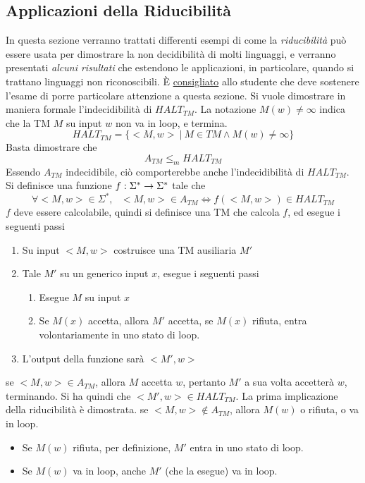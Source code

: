 \documentclass[10pt, letterpaper]{report}
\begin{document}
\subsection{Applicazioni della Riducibilità}
In questa sezione verranno trattati differenti esempi di come la \textit{riducibilità} può essere usata per dimostrare la non decidibilità di molti linguaggi, e verranno presentati \textit{alcuni risultati} che estendono le applicazioni, in particolare, quando si trattano linguaggi non riconoscibili. È \underline{consigliato} allo studente che deve sostenere l'esame di porre particolare attenzione a questa sezione.
Si vuole dimostrare in maniera formale l'indecidibilità di $HALT_{TM}$. La notazione $M(w)\ne\infty$ indica che la TM $M$ su input $w$ non va in loop, e termina. 
$$ HALT_{TM}=\{<M,w> \ | \ M\in TM\land M(w)\ne\infty \}$$
Basta dimostrare che $$ A_{TM}\le_m HALT_{TM}$$
Essendo $A_{TM}$ indecidibile, ciò comporterebbe anche l'indecidibilità di $HALT_{TM}$. Si definisce una funzione ${f:\Sigma^*\rightarrow \Sigma^*}$ tale che 
$$ \forall <M,w>\in\Sigma^*, \ \ \ <M,w>\in A_{TM}\iff f(<M,w>)\in HALT_{TM}$$
$f$ deve essere calcolabile, quindi si definisce una TM che calcola $f$, ed esegue i seguenti passi 
\begin{enumerate}
    \item Su input $<M,w>$ costruisce una TM ausiliaria $M'$
    \item Tale $M'$ su un generico input $x$, esegue i seguenti passi\begin{enumerate}
        \item Esegue $M$ su input $x$
        \item Se $M(x)$ accetta, allora $M'$ accetta, se $M(x)$ rifiuta, entra volontariamente in uno stato di loop.
    \end{enumerate}
    \item L'output della funzione sarà $<M',w>$
\end{enumerate}
\boxedMath{$\implies$} se $<M,w>\in A_{TM}$, allora $M$ accetta $w$, pertanto $M'$ a sua volta accetterà $w$, terminando. Si ha quindi che $<M',w>\in HALT_{TM}$. La prima implicazione della riducibilità è dimostrata. \acc 
\boxedMath{$\impliedby$} se $<M,w>\notin A_{TM}$, allora $M(w)$ o rifiuta, o va in loop. \begin{itemize}
    \item Se $M(w)$ rifiuta, per definizione, $M'$ entra in uno stato di loop. 
    \item Se $M(w)$ va in loop, anche $M'$ (che la esegue) va in loop.
\end{itemize}
\end{document}
